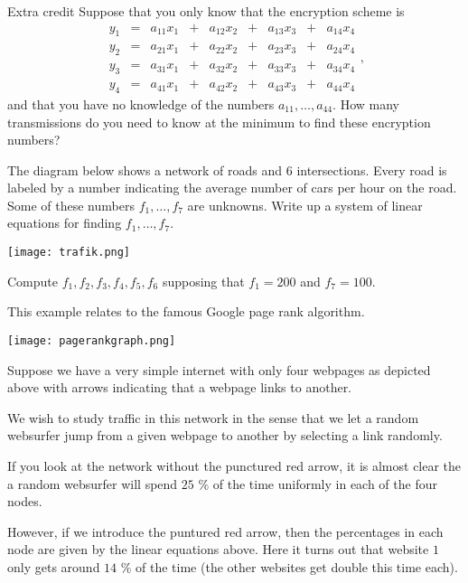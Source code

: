\documentclass{article}
\begin{document}
\begin{hideinbutton}{Extra credit}
  Suppose that you only know that the encryption scheme is
\begin{equation*}
\begin{matrix}
  y_1 &= &a_{11} x_1 &+ & a_{12} x_2 &+ &a_{13} x_3 &+  &a_{14} x_4\\
  y_2 &= &a_{21} x_1 &+ &a_{22} x_2 &+ &a_{23} x_3 &+  &a_{24} x_4\\
  y_3 &= &a_{31} x_1 &+ &a_{32} x_2 &+ &a_{33} x_3 &+  &a_{34} x_4\\
  y_4 &= &a_{41} x_1 &+ &a_{42} x_2 &+ &a_{43} x_3 &+  &a_{44} x_4
\end{matrix},
\end{equation*}
and that you have no knowledge of the numbers $a_{11}, \dots, a_{44}$.
How many transmissions do you need to know at the minimum to find
these encryption numbers?
\end{hideinbutton}

\endshex


\beginshex
The diagram below shows a network of roads and $6$ intersections.
Every road is labeled by a number indicating the average number
of cars per hour on the road. Some of these numbers 
$f_1, \dots, f_7$ are unknowns. Write up a system of linear
equations for finding $f_1, \dots, f_7$. 

\texttt{[image: trafik.png]}


Compute
$f_1, f_2, f_3, f_4, f_5, f_6$ supposing that $f_1=200$ and $f_7=100$.
\endshex


\begin{example}\label{Googleprlineqs}

This example relates to the famous Google page rank algorithm.  

  \texttt{[image: pagerankgraph.png]}


  Suppose we have a very simple internet with only four webpages
  as depicted above with arrows indicating that a webpage links to another.

  We wish to study traffic in this network in the sense that we let a random
  websurfer jump from a given webpage to another by selecting a link randomly.

  If you look at the network without the punctured red arrow, it is almost clear
  the a random websurfer will spend $25$ \% of the time uniformly in each of the
  four nodes.

  However, if we introduce the puntured red arrow, then the percentages in
  each node are given by the linear equations above. Here it turns out that
  website $1$ only gets around $14$ \% of the time (the other websites get double this time each).

\end{example}
\end{document}

